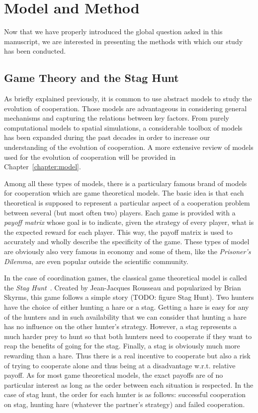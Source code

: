 


\section{Model and Method}

  Now that we have properly introduced the global question asked in this manuscript, we are interested in presenting the methods with which our study has been conducted.
  
  \subsection{Game Theory and the Stag Hunt}

    As briefly explained previously, it is common to use abstract models to study the evolution of cooperation. Those models are advantageous in considering general mechanisms and capturing the relations between key factors. From purely computational models to spatial simulations, a considerable toolbox of models has been expanded during the past decades in order to increase our understanding of the evolution of cooperation. A more extensive review of models used for the evolution of cooperation will be provided in Chapter~\ref{chapter:model}.

    Among all these types of models, there is a particulary famous brand of models for cooperation which are game theoretical models. The basic idea is that each theoretical is supposed to represent a particular aspect of a cooperation problem between several (but most often two) players. Each game is provided with a \emph{payoff matrix} whose goal is to indicate, given the strategy of every player, what is the expected reward for each player. This way, the payoff matrix is used to accurately and wholly describe the specificity of the game. These types of model are obviously also very famous in economy and some of them, like the \emph{Prisoner's Dilemma}, are even popular outside the scientific community.

    In the case of coordination games, the classical game theoretical model is called the \emph{Stag Hunt}~\cite{Skyrms2004}. Created by Jean-Jacques Rousseau and popularized by Brian Skyrms, this game follows a simple story (TODO: figure Stag Hunt). Two hunters have the choice of either hunting a hare or a stag. Getting a hare is easy for any of the hunters and in such availability that we can consider that hunting a hare has no influence on the other hunter's strategy. However, a stag represents a much harder prey to hunt so that both hunters need to cooperate if they want to reap the benefits of going for the stag. Finally, a stag is obviously much more rewarding than a hare. Thus there is a real incentive to cooperate but also a risk of trying to cooperate alone and thus being at a disadvantage w.r.t. relative payoff. As for most game theoretical models, the exact payoffs are of no particular interest as long as the order between each situation is respected. In the case of stag hunt, the order for each hunter is as follows: successful cooperation on stag, hunting hare (whatever the partner's strategy) and failed cooperation.

